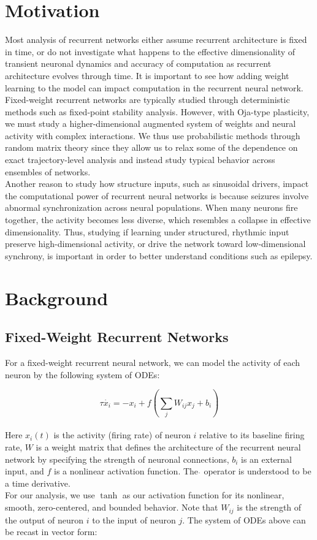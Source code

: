 \documentclass[paper=a4, fontsize=11pt]{scrartcl} %
\numberwithin{equation}{section} %
\numberwithin{figure}{section} %
\numberwithin{table}{section} %
\begin{document}
\section{Motivation}
Most analysis of recurrent networks either assume recurrent architecture is fixed in time, or do not investigate what happens to the effective dimensionality of transient neuronal dynamics and accuracy of computation as recurrent architecture evolves through time. It is important to see how adding weight learning to the model can impact computation in the recurrent neural network.
\vspace{0.5cm}
\\
Fixed-weight recurrent networks are typically studied through deterministic methods such as fixed-point stability analysis. However, with Oja-type plasticity, we must study a higher-dimensional augmented system of weights and neural activity with complex interactions. We thus use probabilistic methods through random matrix theory since they allow us to relax some of the dependence on exact trajectory-level analysis and instead study typical behavior across ensembles of networks.
\vspace{0.5cm}
\\
Another reason to study how structure inputs, such as sinusoidal drivers, impact the computational power of recurrent neural networks is because seizures involve abnormal synchronization across neural populations. When many neurons fire together, the activity becomes less diverse, which resembles a collapse in effective dimensionality. Thus, studying if learning under structured, rhythmic input preserve high-dimensional activity, or drive the network toward low-dimensional synchrony, is important in order to better understand conditions such as epilepsy.

\section{Background}
\subsection{Fixed-Weight Recurrent Networks}
For a fixed-weight recurrent neural network, we can model the activity of each neuron by the following system of ODEs:

\begin{equation}
\tau \dot{x_i} = -x_i+f\left(\sum_j W_{ij}x_j+b_i\right)
\end{equation}
\\
Here \(x_i(t)\) is the activity (firing rate) of neuron \(i\) relative to its baseline firing rate, \(W\) is a weight matrix that defines the architecture of the recurrent neural network by specifying the strength of neuronal connections, \(b_i\) is an external input, and \(f\) is a nonlinear activation function. The $\dot{}$ operator is understood to be a time derivative.
\vspace{0.5cm}
\\
For our analysis, we use $\tanh$ as our activation function for its nonlinear, smooth, zero-centered, and bounded behavior. Note that \(W_{ij}\) is the strength of the output of neuron $i$ to the input of neuron $j$. The system of ODEs above can be recast in vector form:
\end{document}
